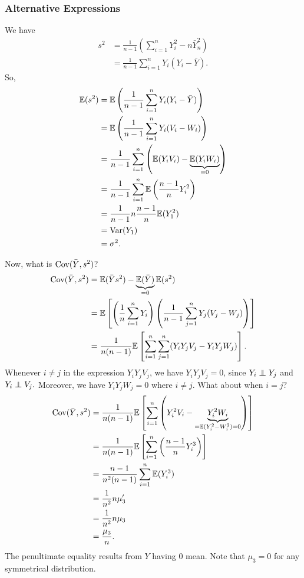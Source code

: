     \subsubsection{Alternative Expressions}
We have
    \begin{align*}
        s^2&=\frac{1}{n-1}\left(\sum^n_{i=1}Y_i^2-n\bar Y_n^2\right) \\
        &=\frac{1}{n-1}\sum^n_{i=1}Y_i(Y_i-\bar Y).
    \end{align*}
    So,
    \begin{align*}
        \mathbb E(s^2)&=\mathbb E\left(\frac{1}{n-1}\sum^n_{i=1}Y_i(Y_i-\bar Y)\right) \\
        &=\mathbb E\left(\frac{1}{n-1}\sum^n_{i=1}Y_i(V_i-W_i)\right) \\
        &=\frac{1}{n-1}\sum^n_{i=1}\left(\mathbb E(Y_iV_i)-\underbrace{\mathbb E(Y_iW_i)}_{=0}\right) \\
        &=\frac{1}{n-1}\sum^n_{i=1}\mathbb E\left(\frac{n-1}{n}Y_i^2\right) \\
        &=\frac{1}{n-1}n\frac{n-1}{n}\mathbb E(Y_1^2) \\
        &=\operatorname*{Var}(Y_1)\\
        &=\sigma^2.
    \end{align*}

Now, what is $\operatorname*{Cov}(\bar Y,s^2)$?
\begin{align*}
    \operatorname*{Cov}(\bar Y, s^2)&=\mathbb E(\bar Ys^2)-\underbrace{\mathbb E(\bar Y)}_{=0}\mathbb E(s^2)\\
    &=\mathbb E\left[\left(\frac{1}{n}\sum^n_{i=1}Y_i\right)\left(\frac{1}{n-1}\sum^n_{j=1}Y_j(V_j-W_j)\right)\right] \\
    &=\frac{1}{n(n-1)}\mathbb E\left[\sum^n_{i=1}\sum^n_{j=1}(Y_iY_jV_j-Y_iY_jW_j)\right].
\end{align*}
Whenever $i\neq j$ in the expression $Y_iY_jV_j$, we have $Y_iY_jV_j=0$, since $Y_i\ind Y_j$ and $Y_i\ind V_j.$ Moreover, we have $Y_iY_jW_j=0$ where $i\neq j$. What about when $i=j?$
\begin{align*}
    \operatorname*{Cov}(\bar Y,s^2)&=\frac{1}{n(n-1)}\mathbb E\left[\sum^n_{i=1}\left(Y_i^2V_i-\underbrace{Y_i^2W_i}_{=\mathbb E(Y_i^2-W_i^2)=0}\right)\right] \\
    &=\frac{1}{n(n-1)}\mathbb E\left[\sum^n_{i=1}\left(\frac{n-1}{n}Y_i^3\right)\right] \\
    &=\frac{n-1}{n^2(n-1)}\sum^n_{i=1}\mathbb E(Y_i^3) \\
    &=\frac{1}{n^2}n\mu'_3 \\
	&=\frac{1}{n^2}n\mu_3 \\
    &=\frac{\mu_3}{n}.
\end{align*}
The penultimate equality results from $Y$ having 0 mean. Note that $\mu_3=0$ for any symmetrical distribution.

